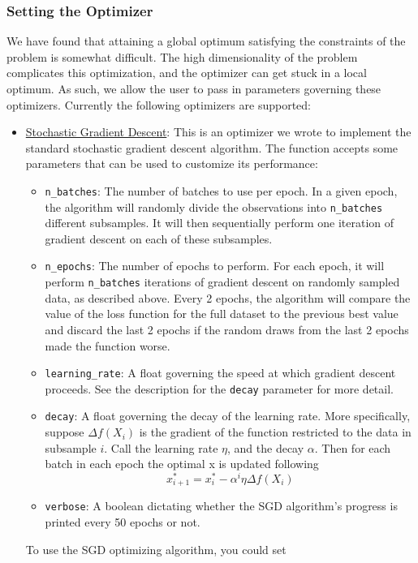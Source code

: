 \documentclass[12pt]{article}
\begin{document}
\subsubsection{Setting the Optimizer}\label{optimizer}

We have found that attaining a global optimum satisfying the constraints of the problem is somewhat difficult. The high dimensionality of the problem complicates this optimization, and the optimizer can get stuck in a local optimum. As such, we allow the user to pass in parameters governing these optimizers. Currently the following optimizers are supported:

\begin{itemize}
    \item \underline{Stochastic Gradient Descent}: This is an optimizer we wrote to implement the standard stochastic gradient descent algorithm. The function accepts some parameters that can be used to customize its performance:
    \begin{itemize}
        \item \lstinline{n_batches}: The number of batches to use per epoch. In a given epoch, the algorithm will randomly divide the observations into \lstinline{n_batches} different subsamples. It will then sequentially perform one iteration of gradient descent on each of these subsamples.
        \item \lstinline{n_epochs}: The number of epochs to perform. For each epoch, it will perform \lstinline{n_batches} iterations of gradient descent on randomly sampled data, as described above. Every 2 epochs, the algorithm will compare the value of the loss function for the full dataset to the previous best value and discard the last 2 epochs if the random draws from the last 2 epochs made the function worse.
        \item \lstinline{learning_rate}: A float governing the speed at which gradient descent proceeds. See the description for the \lstinline{decay} parameter for more detail.
        \item \lstinline{decay}: A float governing the decay of the learning rate. More specifically, suppose $\Delta f(X_i)$ is the gradient of the function restricted to the data in subsample $i$. Call the learning rate $\eta$, and the decay $\alpha$. Then for each batch in each epoch the optimal x is updated following
        \begin{equation}
            x^*_{i+1} = x^*_i - \alpha^i \eta \Delta f(X_i)
        \end{equation}
        \item \lstinline{verbose}: A boolean dictating whether the SGD algorithm's progress is printed every 50 epochs or not.
    \end{itemize}
    To use the SGD optimizing algorithm, you could set


\end{itemize}
\end{document}
